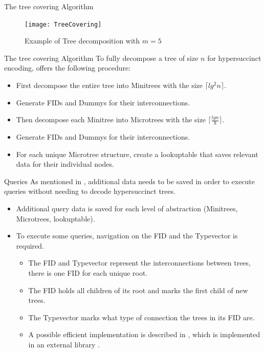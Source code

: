 \documentclass{beamer}
\begin{document}
\begin{frame}{The tree covering Algorithm}
\begin{figure}[t]
	\texttt{[image: TreeCovering]}
\caption{Example of Tree decomposition with $m = 5$ \cite{farzanMunro}}
\end{figure}
\end{frame}

\begin{frame}{The tree covering Algorithm}
	To fully decompose a tree of size $n$ for hypersuccinct encoding, \cite{farzanMunro} offers the following procedure:
	\begin{itemize}
	\item
		First decompose the entire tree into Minitrees with the size $\lceil lg^{2} n \rceil$.
	\item
		Generate FIDs and Dummys for their interconnections.
	\item
		Then decompose each Minitree into Microtrees with the size $\lceil \frac{lg n}{8} \rceil$.
	\item
		Generate FIDs and Dummys for their interconnections.
	\item
		For each unique Microtree structure, create a lookuptable that saves relevant data for their individual nodes.
	\end{itemize}
\end{frame}

\begin{frame}{Queries}
	As mentioned in \cite{farzanMunro}, additional data needs to be saved in order to execute queries without needing to decode hypersuccinct trees.
	\begin{itemize}
	\item
		Additional query data is saved for each level of abstraction (Minitrees, Microtrees, lookuptable).
	\item
		To execute some queries, navigation on the FID and the Typevector is required.
		\begin{itemize}
			\item
				The FID and Typevector represent the interconnections between trees, there is one FID for each unique root.
			\item
				The FID holds all children of its root and marks the first child of new trees.
			\item
				The Typevector marks what type of connection the trees in its FID are.
			\item
				A possible efficient implementation is described in \cite{succinctBV}, which is implemented in an external library \cite{succinctBVLink}.
		\end{itemize}
	\end{itemize}
\end{frame}
\end{document}
